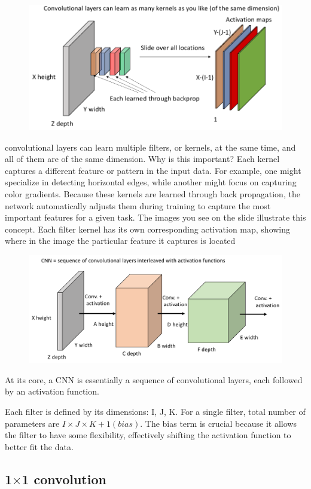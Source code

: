 \documentclass[11pt]{article}
\begin{document}
\begin{figure}[H]
    \centering
    \includegraphics[width=.6\linewidth]{figures/features.png}
\end{figure}

convolutional layers can learn multiple filters, or kernels, at the same time, and all of them are of the same dimension. Why is this important? Each kernel captures a different feature or pattern in the input data. For example, one might specialize in detecting horizontal edges, while another might focus on capturing color gradients. Because these kernels are learned through back propagation, the network automatically adjusts them during training to capture the most important features for a given task. The images you see on the slide illustrate this concept. Each filter kernel has its own corresponding activation map, showing where in the image the particular feature it captures is located

\begin{figure}[H]
    \centering
    \includegraphics[width=.6\linewidth]{figures/CNN.png}
\end{figure}

At its core, a CNN is essentially a sequence of convolutional layers, each followed by an activation function. 

Each filter is defined by its dimensions: I, J, K. For a single filter, total number of parameters are $I\times J\times K + 1 (bias)$. The bias term is crucial because it allows the filter to have some flexibility, effectively shifting the activation function to better fit the data.

\subsection{1$\times$1 convolution}
\end{document}
